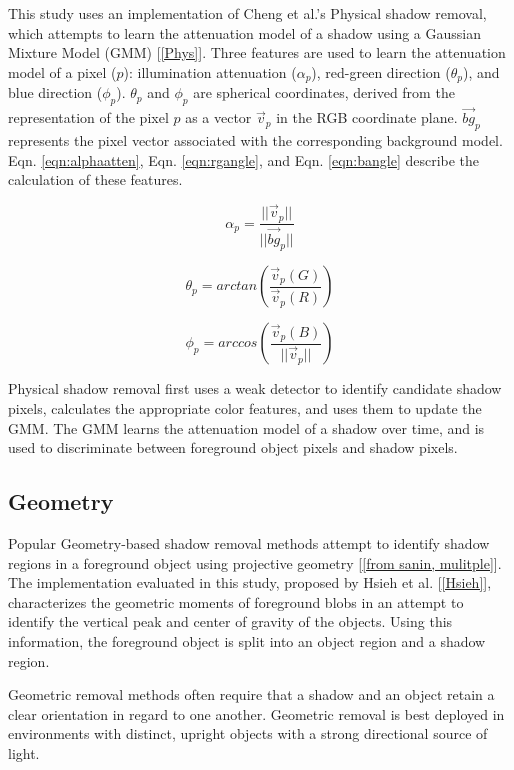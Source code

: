 This study uses an implementation of Cheng et al.'s Physical shadow removal, which attempts to learn the attenuation model of a shadow using a Gaussian Mixture Model (GMM) [\ref{Phys}]. Three features are used to learn the attenuation model of a pixel ($p$): illumination attenuation ($\alpha_{p}$), red-green direction ($\theta_{p}$), and blue direction ($\phi_{p}$). $\theta_{p}$ and $\phi_{p}$ are spherical coordinates, derived from the representation of the pixel $p$ as a vector $\vec{v}_{p}$ in the RGB coordinate plane. $\vec{bg}_{p}$ represents the pixel vector associated with the corresponding background model. Eqn. \ref{eqn:alphaatten}, Eqn. \ref{eqn:rgangle}, and Eqn. \ref{eqn:bangle} describe the calculation of these features.

\begin{equation} \label{eqn:alphaatten}
\alpha_{p} = \dfrac{||\vec{v}_{p}||}{||\vec{bg}_{p}||}
\end{equation}

\begin{equation} \label{eqn:rgangle}
\theta_{p} = arctan(\dfrac{\vec{v}_{p}(G)}{\vec{v}_{p}(R)})
\end{equation}

\begin{equation} \label{eqn:bangle}
\phi_{p} = arccos(\dfrac{\vec{v}_{p}(B)}{||\vec{v}_{p}||})
\end{equation}

Physical shadow removal first uses a weak detector to identify candidate shadow pixels, calculates the appropriate color features, and uses them to update the GMM. The GMM learns the attenuation model of a shadow over time, and is used to discriminate between foreground object pixels and shadow pixels.

\subsection{Geometry}

Popular Geometry-based shadow removal methods attempt to identify shadow regions in a foreground object using projective geometry [\ref{from sanin, mulitple}]. The implementation evaluated in this study, proposed by Hsieh et al. [\ref{Hsieh}], characterizes the geometric moments of foreground blobs in an attempt to identify the vertical peak and center of gravity of the objects. Using this information, the foreground object is split into an object region and a shadow region.

Geometric removal methods often require that a shadow and an object retain a clear orientation in regard to one another. Geometric removal is best deployed in environments with distinct, upright objects with a strong directional source of light.  

